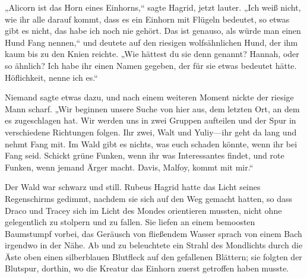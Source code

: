 „Alicorn ist das Horn eines Einhorns,“ sagte Hagrid, jetzt lauter. „Ich weiß nicht, wie ihr alle darauf kommt, dass es ein Einhorn mit Flügeln bedeutet, so etwas gibt es nicht, das habe ich noch nie gehört. Das ist genauso, als würde man einen Hund Fang nennen,“ und deutete auf den riesigen wolfsähnlichen Hund, der ihm kaum bis zu den Knien reichte. „Wie hättest du sie denn genannt? Hannah, oder so ähnlich? Ich habe ihr einen Namen gegeben, der für sie etwas bedeutet hätte. Höflichkeit, nenne ich es.“

Niemand sagte etwas dazu, und nach einem weiteren Moment nickte der riesige Mann scharf. „Wir beginnen unsere Suche von hier aus, dem letzten Ort, an dem es zugeschlagen hat. Wir werden uns in zwei Gruppen aufteilen und der Spur in verschiedene Richtungen folgen. Ihr zwei, Walt und Yuliy—ihr geht da lang und nehmt Fang mit. Im Wald gibt es nichts, was euch schaden könnte, wenn ihr bei Fang seid. Schickt grüne Funken, wenn ihr was Interessantes findet, und rote Funken, wenn jemand Ärger macht. Davis, Malfoy, kommt mit mir.“

Der Wald war schwarz und still. Rubeus Hagrid hatte das Licht seines Regenschirms gedimmt, nachdem sie sich auf den Weg gemacht hatten, so dass Draco und Tracey sich im Licht des Mondes orientieren mussten, nicht ohne gelegentlich zu stolpern und zu fallen. Sie liefen an einem bemoosten Baumstumpf vorbei, das Geräusch von fließendem Wasser sprach von einem Bach irgendwo in der Nähe. Ab und zu beleuchtete ein Strahl des Mondlichts durch die Äste oben einen silberblauen Blutfleck auf den gefallenen Blättern; sie folgten der Blutspur, dorthin, wo die Kreatur das Einhorn zuerst getroffen haben musste.

